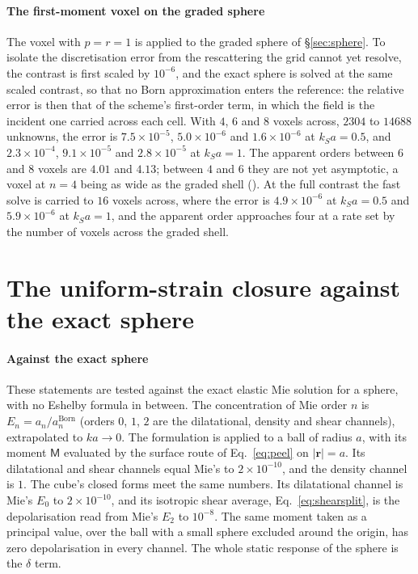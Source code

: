 \documentclass[preprint,review,12pt]{elsarticle}
\begin{document}
\paragraph{The first-moment voxel on the graded sphere} The voxel with $p=r=1$ is applied to the graded
sphere of \S\ref{sec:sphere}. To isolate the discretisation error from the rescattering the grid cannot
yet resolve, the contrast is first scaled by $10^{-6}$, and the exact sphere is solved at the same scaled
contrast, so that no Born approximation enters the reference: the relative error is then that of the
scheme's first-order term, in which the field is the incident one carried across each cell. With $4$, $6$
and $8$ voxels across, $2304$ to $14688$ unknowns, the error is $7.5\times10^{-5}$, $5.0\times10^{-6}$ and
$1.6\times10^{-6}$ at $k_Sa=0.5$, and $2.3\times10^{-4}$, $9.1\times10^{-5}$ and $2.8\times10^{-5}$ at
$k_Sa=1$. The apparent orders between $6$ and $8$ voxels are $4.01$ and $4.13$; between $4$ and $6$ they
are not yet asymptotic, a voxel at $n=4$ being as wide as the graded shell
(). At the full contrast the fast solve is carried to
$16$ voxels across, where the error is $4.9\times10^{-6}$ at $k_Sa=0.5$ and $5.9\times10^{-6}$ at
$k_Sa=1$, and the apparent order approaches four at a rate set by the number of voxels across the graded
shell.

\section{The uniform-strain closure against the exact sphere}\label{app:closuremie}

\paragraph{Against the exact sphere} These statements are tested against the exact elastic Mie
solution for a sphere, with no Eshelby formula in between. The concentration of Mie order $n$ is
$E_n=a_n/a_n^{\text{Born}}$ (orders $0$, $1$, $2$ are the dilatational, density and shear
channels), extrapolated to $ka\to0$. The formulation is applied to a ball of radius $a$, with its moment
$\mathsf M$ evaluated by the surface route of Eq.~\eqref{eq:peel} on $|\mathbf r|=a$. Its
dilatational and shear channels equal Mie's to $2\times10^{-10}$, and the density channel is
$1$. The cube's closed forms meet the same numbers. Its dilatational channel is Mie's
$E_0$ to $2\times10^{-10}$, and its isotropic shear average, Eq.~\eqref{eq:shearsplit}, is the
depolarisation read from Mie's $E_2$ to $10^{-8}$. The same moment taken as a principal value, over
the ball with a small sphere excluded around the origin, has zero depolarisation in every
channel. The whole static response of the sphere is the $\delta$ term.
\end{document}
